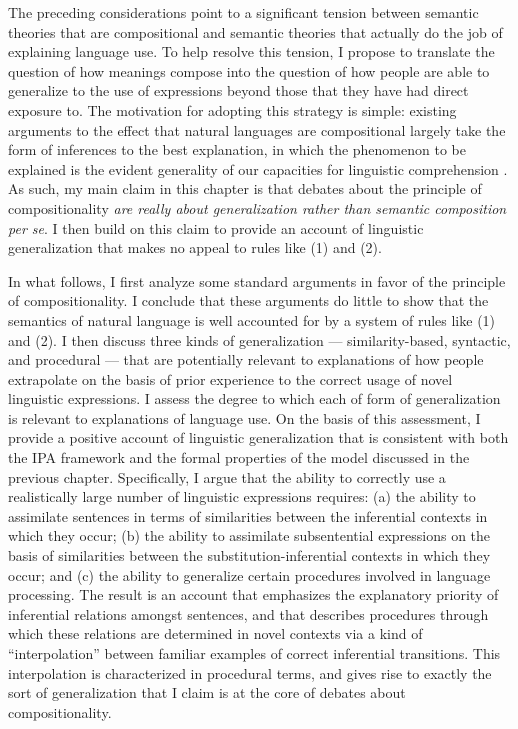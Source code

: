 The preceding considerations point to a significant tension between semantic theories that are compositional and semantic theories that actually do the job of explaining language use. To help resolve this tension, I propose to translate the question of how meanings compose into the question of how people are able to generalize to the use of expressions beyond those that they have had direct exposure to. The motivation for adopting this strategy is simple: existing arguments to the effect that natural languages are compositional largely take the form of inferences to the best explanation, in which the phenomenon to be explained is the evident generality of our capacities for linguistic comprehension \citep{Szabo:2013,Szabo:2012}. As such, my main claim in this chapter is that debates about the principle of compositionality \textit{are really about generalization rather than semantic composition per se}. I then build on this claim to provide an account of linguistic generalization that makes no appeal to rules like (1) and (2).

In what follows, I first analyze some standard arguments in favor of the principle of compositionality. I conclude that these arguments do little to show that the semantics of natural language is well accounted for by a system of rules like (1) and (2). I then discuss three kinds of generalization --- similarity-based, syntactic, and procedural --- that are potentially relevant to explanations of how people extrapolate on the basis of prior experience to the correct usage of novel linguistic expressions. I assess the degree to which each of form of generalization is relevant to explanations of language use. On the basis of this assessment, I provide a positive account of linguistic generalization that is consistent with both the IPA framework and the formal properties of the model discussed in the previous chapter. Specifically, I argue that the ability to correctly use a realistically large number of linguistic expressions requires: (a) the ability to assimilate sentences in terms of similarities between the inferential contexts in which they occur; (b) the ability to assimilate subsentential expressions on the basis of similarities between the substitution-inferential contexts in which they occur; and (c) the ability to generalize certain procedures involved in language processing. The result is an account that emphasizes the explanatory priority of inferential relations amongst sentences, and that describes procedures through which these relations are determined in novel contexts via a kind of ``interpolation'' between familiar examples of correct inferential transitions. This interpolation is characterized in procedural terms, and gives rise to exactly the sort of generalization that I claim is at the core of debates about compositionality.

